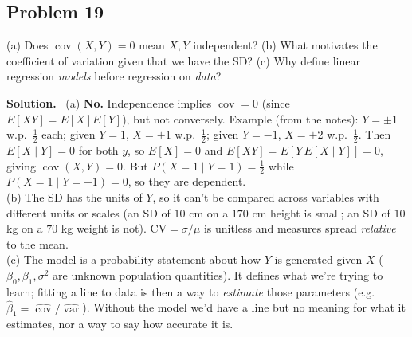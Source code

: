 \documentclass[11pt]{article}
\newenvironment{soln}{\par\smallskip\noindent\textbf{Solution.}\ }{\par\medskip}
\begin{document}
\subsection*{Problem 19}
(a) Does $\operatorname{cov}(X,Y)=0$ mean $X,Y$ independent? (b) What motivates the coefficient of variation given that we have the SD? (c) Why define linear regression \emph{models} before regression on \emph{data}?
\begin{soln}
(a) \textbf{No.} Independence implies $\operatorname{cov}=0$ (since $E[XY]=E[X]E[Y]$), but not conversely. Example (from the notes): $Y=\pm1$ w.p.\ $\frac12$ each; given $Y=1$, $X=\pm1$ w.p.\ $\frac12$; given $Y=-1$, $X=\pm2$ w.p.\ $\frac12$. Then $E[X\mid Y]=0$ for both $y$, so $E[X]=0$ and $E[XY]=E[Y\,E[X\mid Y]]=0$, giving $\operatorname{cov}(X,Y)=0$. But $P(X{=}1\mid Y{=}1)=\frac12$ while $P(X{=}1\mid Y{=}-1)=0$, so they are dependent.\\
(b) The SD has the units of $Y$, so it can't be compared across variables with different units or scales (an SD of $10$ cm on a $170$ cm height is small; an SD of $10$ kg on a $70$ kg weight is not). $\mathrm{CV}=\sigma/\mu$ is unitless and measures spread \emph{relative} to the mean.\\
(c) The model is a probability statement about how $Y$ is generated given $X$ ($\beta_0,\beta_1,\sigma^2$ are unknown population quantities). It defines what we're trying to learn; fitting a line to data is then a way to \emph{estimate} those parameters (e.g.\ $\hat\beta_1=\widehat{\operatorname{cov}}/\widehat{\operatorname{var}}$). Without the model we'd have a line but no meaning for what it estimates, nor a way to say how accurate it is.
\end{soln}

\end{document}
